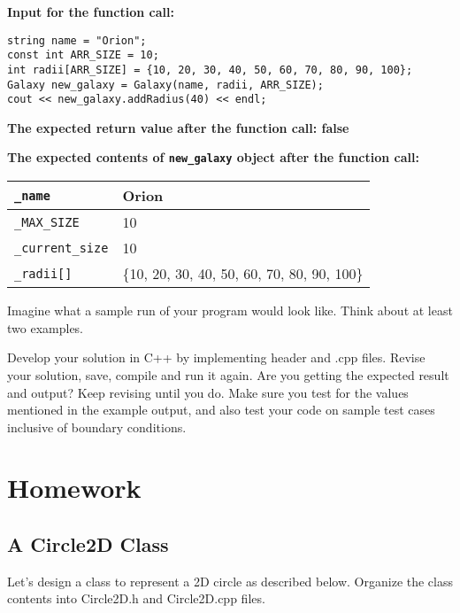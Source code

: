 \textbf{Input for the function call:}

\begin{verbatim}
string name = "Orion";
const int ARR_SIZE = 10;
int radii[ARR_SIZE] = {10, 20, 30, 40, 50, 60, 70, 80, 90, 100};
Galaxy new_galaxy = Galaxy(name, radii, ARR_SIZE);
cout << new_galaxy.addRadius(40) << endl;
\end{verbatim}

\textbf{The expected return value after the function call: false}


\textbf{The expected contents of \texttt{new\_galaxy} object after the function call:}

\begin{table}[H]
    \centering
    \begin{tabular}{p{2in}|p{4in}}
        \texttt{\_name} & Orion \\
        \hline
        \texttt{\_MAX\_SIZE} & 10 \\
        \hline
        \texttt{\_current\_size} & 10 \\
        \hline
        \texttt{\_radii[]} & \{10, 20, 30, 40, 50, 60, 70, 80, 90, 100\} \\
    \end{tabular}
\end{table}

\begin{multipart}
Imagine what a sample run of your program would look like. Think about at least two examples.
\end{multipart}
\vspace{6 cm}
\begin{multipart}
Develop your solution in C++ by implementing header and .cpp files. Revise your solution, save, compile and run it again. Are you getting the expected result and output? Keep revising until you do. Make sure you test for the values mentioned in the example output, and also test your code on sample test cases inclusive of boundary conditions.
\end{multipart}


\section{Homework}

\subsection{A Circle2D Class}
Let’s design a class to represent a 2D circle as described below. Organize the class contents into Circle2D.h and Circle2D.cpp files.

